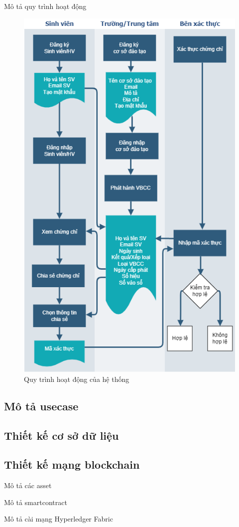 Mô tả quy trình hoạt động
\begin{figure}[htbp]
\centering
\includegraphics[width=.9\linewidth]{img/vbcc_diagram2.png}
\caption{Quy trình hoạt động của hệ thống}
\label{fig:vbcc_diagram}
\end{figure}
\subsection{Mô tả usecase}
\subsection{Thiết kế cơ sở dữ liệu}
\subsection{Thiết kế mạng blockchain}

Mô tả các asset

Mô tả smartcontract

Mô tả cài mạng Hyperledger Fabric

